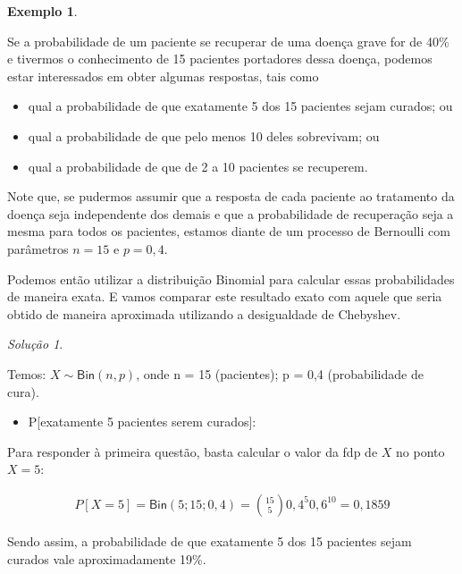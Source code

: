 \documentclass[
]{book}
\providecommand{\tightlist}{%
  \setlength{\itemsep}{0pt}\setlength{\parskip}{0pt}}
\theoremstyle{definition}
\theoremstyle{definition}
\newtheorem{example}{Exemplo}[chapter]
\theoremstyle{definition}
\theoremstyle{remark}
\newtheorem*{solution}{Solução}
\begin{document}
\begin{example}
\protect\hypertarget{exm:unnamed-chunk-3}{}{\label{exm:unnamed-chunk-3} }
\end{example}

Se a probabilidade de um paciente se recuperar de uma doença grave for de 40\% e tivermos o conhecimento de 15 pacientes portadores dessa doença, podemos estar interessados em obter algumas respostas, tais como

\begin{itemize}
\tightlist
\item
  qual a probabilidade de que exatamente 5 dos 15 pacientes sejam curados; ou
\item
  qual a probabilidade de que pelo menos 10 deles sobrevivam; ou
\item
  qual a probabilidade de que de 2 a 10 pacientes se recuperem.
\end{itemize}

Note que, se pudermos assumir que a resposta de cada paciente ao tratamento da doença seja independente dos demais e que a probabilidade de recuperação seja a mesma para todos os pacientes, estamos diante de um processo de Bernoulli com parâmetros \(n = 15\) e \(p = 0,4\).

Podemos então utilizar a distribuição Binomial para calcular essas probabilidades de maneira exata. E vamos comparar este resultado exato com aquele que seria obtido de maneira aproximada utilizando a desigualdade de Chebyshev.

\begin{solution}
{}
\end{solution}

Temos: \(X \sim \textsf{Bin}(n,p)\), onde n = 15 (pacientes); p = 0,4 (probabilidade de cura).

\begin{itemize}
\tightlist
\item
  P{[}exatamente 5 pacientes serem curados{]}:
\end{itemize}

Para responder à primeira questão, basta calcular o valor da fdp de \(X\) no ponto \(X = 5\):

\begin{align*}
  P[X = 5] = \textsf{Bin}(5; 15; 0,4)  = \binom{15}{5}0,4^5 0,6^{10} = 0,1859
\end{align*}

Sendo assim, a probabilidade de que exatamente 5 dos 15 pacientes sejam curados vale aproximadamente 19\%.
\end{document}
